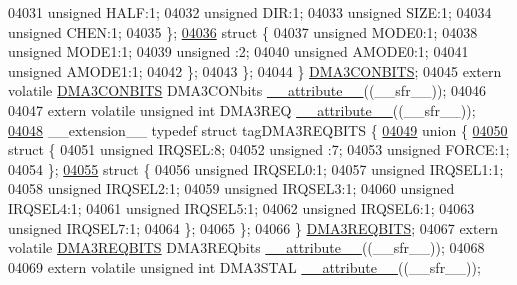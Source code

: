 \begin{DoxyCode}
04031       \textcolor{keywordtype}{unsigned} HALF:1;
04032       \textcolor{keywordtype}{unsigned} DIR:1;
04033       \textcolor{keywordtype}{unsigned} SIZE:1;
04034       \textcolor{keywordtype}{unsigned} CHEN:1;
04035     \};
\hypertarget{a00009_source_l04036}{}\hyperlink{a00009}{04036}     \textcolor{keyword}{struct }\{
04037       \textcolor{keywordtype}{unsigned} MODE0:1;
04038       \textcolor{keywordtype}{unsigned} MODE1:1;
04039       \textcolor{keywordtype}{unsigned} :2;
04040       \textcolor{keywordtype}{unsigned} AMODE0:1;
04041       \textcolor{keywordtype}{unsigned} AMODE1:1;
04042     \};
04043   \};
04044 \} \hyperlink{a00008_de/df7/a00418}{DMA3CONBITS};
04045 \textcolor{keyword}{extern} \textcolor{keyword}{volatile} \hyperlink{a00008_de/df7/a00418}{DMA3CONBITS} DMA3CONbits \hyperlink{a00009_a493c46f03454991ccc5aa7a6e1dfb2a7}{\_\_attribute\_\_}((\_\_sfr\_\_));
04046 
04047 \textcolor{keyword}{extern} \textcolor{keyword}{volatile} \textcolor{keywordtype}{unsigned} \textcolor{keywordtype}{int}  DMA3REQ \hyperlink{a00009_a493c46f03454991ccc5aa7a6e1dfb2a7}{\_\_attribute\_\_}((\_\_sfr\_\_));
\hypertarget{a00009_source_l04048}{}\hyperlink{a00008}{04048} \_\_extension\_\_ \textcolor{keyword}{typedef} \textcolor{keyword}{struct }tagDMA3REQBITS \{
\hypertarget{a00009_source_l04049}{}\hyperlink{a00009}{04049}   \textcolor{keyword}{union }\{
\hypertarget{a00009_source_l04050}{}\hyperlink{a00009}{04050}     \textcolor{keyword}{struct }\{
04051       \textcolor{keywordtype}{unsigned} IRQSEL:8;
04052       \textcolor{keywordtype}{unsigned} :7;
04053       \textcolor{keywordtype}{unsigned} FORCE:1;
04054     \};
\hypertarget{a00009_source_l04055}{}\hyperlink{a00009}{04055}     \textcolor{keyword}{struct }\{
04056       \textcolor{keywordtype}{unsigned} IRQSEL0:1;
04057       \textcolor{keywordtype}{unsigned} IRQSEL1:1;
04058       \textcolor{keywordtype}{unsigned} IRQSEL2:1;
04059       \textcolor{keywordtype}{unsigned} IRQSEL3:1;
04060       \textcolor{keywordtype}{unsigned} IRQSEL4:1;
04061       \textcolor{keywordtype}{unsigned} IRQSEL5:1;
04062       \textcolor{keywordtype}{unsigned} IRQSEL6:1;
04063       \textcolor{keywordtype}{unsigned} IRQSEL7:1;
04064     \};
04065   \};
04066 \} \hyperlink{a00008_d2/de1/a00421}{DMA3REQBITS};
04067 \textcolor{keyword}{extern} \textcolor{keyword}{volatile} \hyperlink{a00008_d2/de1/a00421}{DMA3REQBITS} DMA3REQbits \hyperlink{a00009_a493c46f03454991ccc5aa7a6e1dfb2a7}{\_\_attribute\_\_}((\_\_sfr\_\_));
04068 
04069 \textcolor{keyword}{extern} \textcolor{keyword}{volatile} \textcolor{keywordtype}{unsigned} \textcolor{keywordtype}{int}  DMA3STAL \hyperlink{a00009_a493c46f03454991ccc5aa7a6e1dfb2a7}{\_\_attribute\_\_}((\_\_sfr\_\_));

\end{DoxyCode}
